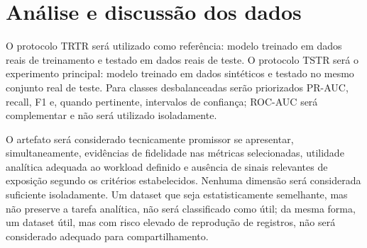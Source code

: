 
\section{Análise e discussão dos dados}

O protocolo TRTR será utilizado como referência: modelo treinado em dados reais
de treinamento e testado em dados reais de teste. O protocolo TSTR será o
experimento principal: modelo treinado em dados sintéticos e testado no mesmo
conjunto real de teste. Para classes desbalanceadas serão priorizados PR-AUC,
recall, F1 e, quando pertinente, intervalos de confiança; ROC-AUC será
complementar e não será utilizado isoladamente.

O artefato será considerado tecnicamente promissor se apresentar,
simultaneamente, evidências de fidelidade nas métricas selecionadas, utilidade
analítica adequada ao workload definido e ausência de sinais relevantes de
exposição segundo os critérios estabelecidos. Nenhuma dimensão será considerada
suficiente isoladamente. Um dataset que seja estatisticamente semelhante, mas não
preserve a tarefa analítica, não será classificado como útil; da mesma forma, um
dataset útil, mas com risco elevado de reprodução de registros, não será
considerado adequado para compartilhamento.
